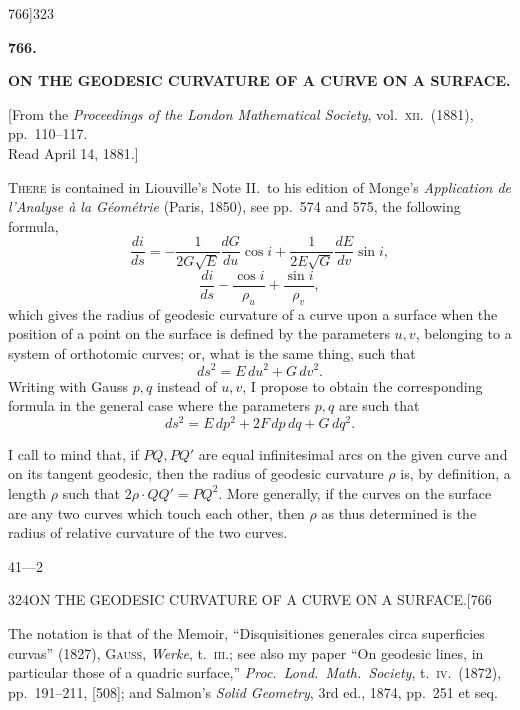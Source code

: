 \documentclass[11pt]{article}
\begin{document}
\begin{center}
{\small 766]\hfill\hfill 323}
\end{center}

\begin{center}\textbf{766.}\end{center}

\begin{center}\textbf{ON THE GEODESIC CURVATURE OF A CURVE ON A SURFACE.}\end{center}

\begin{center}\small [From the \textit{Proceedings of the London Mathematical Society}, vol.\ \textsc{xii}.\ (1881), pp.\ 110--117.\\
Read April 14, 1881.]\end{center}

\textsc{There} is contained in Liouville's Note II.\ to his edition of Monge's \textit{Application
de l'Analyse \`a la G\'eom\'etrie} (Paris, 1850), see pp.\ 574 and 575, the following
formula,
\[
\frac{di}{ds} = -\frac{1}{2G\sqrt{E}}\frac{dG}{du}\cos i + \frac{1}{2E\sqrt{G}}\frac{dE}{dv}\sin i,
\]
\[
\frac{di}{ds} - \frac{\cos i}{\rho_u} + \frac{\sin i}{\rho_v},
\]
which gives the radius of geodesic curvature of a curve upon a surface when the
position of a point on the surface is defined by the parameters $u, v$, belonging to
a system of orthotomic curves; or, what is the same thing, such that
\[
ds^2 = E\,du^2 + G\,dv^2.
\]
Writing with Gauss $p, q$ instead of $u, v$, I propose to obtain the corresponding formula
in the general case where the parameters $p, q$ are such that
\[
ds^2 = E\,dp^2 + 2F\,dp\,dq + G\,dq^2.
\]

I call to mind that, if $PQ, PQ'$ are equal infinitesimal arcs on the given curve
and on its tangent geodesic, then the radius of geodesic curvature $\rho$ is, by definition,
a length $\rho$ such that $2\rho\cdot QQ' = PQ^2$. More generally, if the curves on the surface
are any two curves which touch each other, then $\rho$ as thus determined is the radius
of relative curvature of the two curves.

\begin{center}{\small 41---2}\end{center}

\begin{center}
{\small 324\hfill ON THE GEODESIC CURVATURE OF A CURVE ON A SURFACE.\hfill [766}
\end{center}

The notation is that of the Memoir, ``Disquisitiones generales circa superficies
curvas'' (1827), \textsc{Gauss}, \textit{Werke}, t.\ \textsc{iii}.; see also my paper ``On geodesic lines, in
particular those of a quadric surface,'' \textit{Proc.\ Lond.\ Math.\ Society}, t.\ \textsc{iv}.\ (1872),
pp.\ 191--211, [508]; and Salmon's \textit{Solid Geometry}, 3rd ed., 1874, pp.\ 251 et seq.
\end{document}
